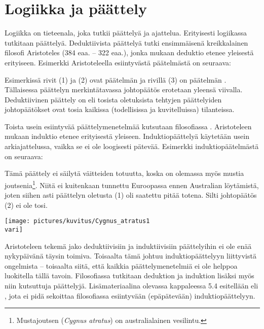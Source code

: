 \chapter{Logiikka ja päättely}

Logiikka on tieteenala, joka tutkii päättelyä ja ajattelua. Erityisesti logiikassa tutkitaan  päättelyä. Deduktiivista päättelyä tutki ensimmäisenä kreikkalainen filosofi Aristoteles (384 eaa. -- 322 eaa.), jonka mukaan deduktio etenee yleisestä erityiseen. Esimerkki Aristoteleella esiintyvästä päätelmästä on seuraava:

\bigskip
\begin{center}
\end{center}
\bigskip

Esimerkissä rivit (1) ja (2) ovat päätelmän  ja rivillä (3) on päätelmän . Tällaisessa päättelyn merkintätavassa johtopäätös erotetaan yleensä viivalla. Deduktiivinen päättely on  eli tosista oletuksista tehtyjen päättelyiden johtopäätökset ovat tosia kaikissa (todellisissa ja kuvitelluissa) tilanteissa.

Toista usein esiintyvää päättelymenetelmää kutsutaan filosofiassa . Aristoteleen mukaan induktio etenee erityisestä yleiseen. Induktiopäättelyä käytetään usein arkiajattelussa, vaikka se ei ole loogisesti pätevää. Esimerkki induktiopäätelmästä on seuraava:

\bigskip
\begin{center}
\end{center}
\bigskip

Tämä päättely ei säilytä väitteiden totuutta, koska on olemassa myös mustia joutsenia\footnote{Mustajoutsen ({\it Cygnus atratus}) on australialainen vesilintu.}. Niitä ei kuitenkaan tunnettu Euroopassa ennen Australian löytämistä, joten siihen asti päättelyn oletusta (1) oli saatettu pitää totena. Silti johtopäätös (2) ei ole tosi.

\bigskip
\begin{center}
    \texttt{[image: pictures/kuvitus/Cygnus\_atratus1\\vari]}
\end{center}
\bigskip

Aristoteleen tekemä jako deduktiivisiin ja induktiivisiin päättelyihin ei ole enää nykypäivänä täysin toimiva. Toisaalta tämä johtuu induktiopäättelyyn liittyvistä ongelmista – toisaalta siitä, että kaikkia päättelymenetelmiä ei ole helppoa luokitella tällä tavoin. Filosofiassa tutkitaan deduktion ja induktion lisäksi myös niin kutsuttuja  päättelyjä. Lisämateriaalina olevassa kappaleessa 5.4 esitellään  eli
, jota ei pidä sekoittaa filosofiassa esiintyvään (epäpätevään) induktiopäättelyyn.

